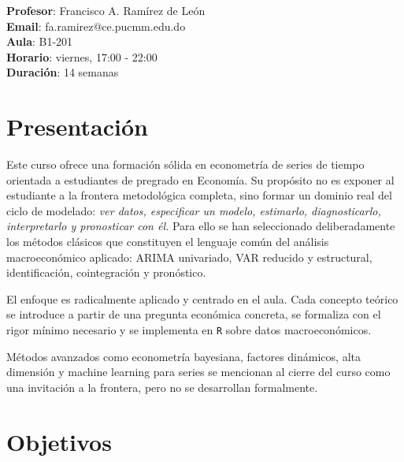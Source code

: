 \documentclass[11pt,letterpaper]{article}
\title{\vspace{-2em}{Pontificia Universidad Católica Madre y Maestra \\
Escuela de Economía \\
Econometría de Series de Tiempo}}
\begin{document}
\maketitle

\textbf{Profesor}: Francisco A. Ramírez de León\\
\textbf{Email}: fa.ramirez@ce.pucmm.edu.do\\
\textbf{Aula}: B1-201\\
\textbf{Horario}: viernes, 17:00 - 22:00\\
\textbf{Duración}: 14 semanas

\thispagestyle{empty}

\vspace{-1em}

\section{Presentación}

Este curso ofrece una formación sólida en econometría de series de tiempo orientada a estudiantes 
de pregrado en Economía. Su propósito no es exponer al estudiante a la frontera metodológica completa,
 sino formar un dominio real del ciclo de modelado: \emph{ver datos, especificar un modelo, estimarlo, diagnosticarlo, interpretarlo y pronosticar con él.} 
 Para ello se han seleccionado deliberadamente los métodos clásicos que constituyen el lenguaje común del análisis macroeconómico aplicado: ARIMA univariado, VAR reducido y estructural, identificación, cointegración y pronóstico.

El enfoque es radicalmente aplicado y centrado en el aula. Cada concepto teórico se introduce a partir 
de una pregunta económica concreta, se formaliza con el rigor mínimo necesario y se implementa en \texttt{R} sobre datos macroeconómicos. 

Métodos avanzados como econometría bayesiana, factores dinámicos, alta dimensión y machine learning para 
series se mencionan al cierre del curso como una invitación a la frontera, pero no se desarrollan 
formalmente.

\section{Objetivos}
\end{document}
